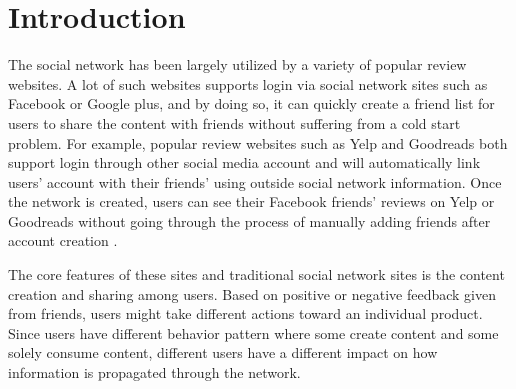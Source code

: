 \section{Introduction}
The social network has been largely utilized by a variety of popular review websites. A lot of
such websites supports login via social network sites such as Facebook or Google plus, and by
doing so, it can quickly create a friend list for users to share the content with friends without
suffering from a cold start problem. For example, popular review websites such as Yelp and
Goodreads both support login through other social media account and will automatically link
users’ account with their friends’ using outside social network information. Once the network
is created, users can see their Facebook friends’ reviews on Yelp or Goodreads without going
through the process of manually adding friends after account creation \cite{Baroni1983}.
\par
The core features of these sites and traditional social network sites is the content creation
and sharing among users. Based on positive or negative feedback given from friends, users
might take different actions toward an individual product. Since users have different behavior
pattern where some create content and some solely consume content, different users have a
different impact on how information is propagated through the network.